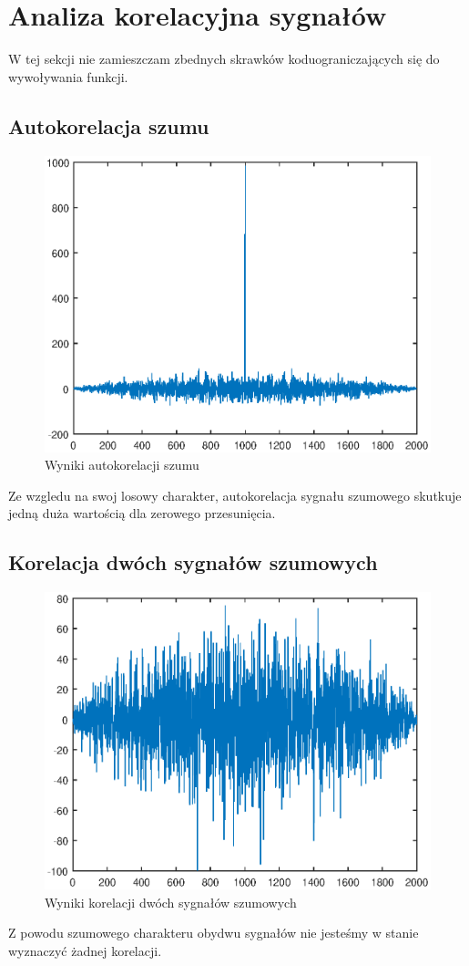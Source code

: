 \documentclass[12pt,titlepage]{report}
\begin{document}
\section{Analiza korelacyjna sygnałów}
W tej sekcji nie zamieszczam zbednych skrawków koduograniczających się do wywoływania funkcji.
\subsection{Autokorelacja szumu}
\begin{figure}[!h]
	\centering
	\includegraphics[scale=0.7]{../cw51_output}
	\caption{Wyniki autokorelacji szumu}
\end{figure}
Ze wzgledu na swoj losowy charakter, autokorelacja sygnału szumowego skutkuje jedną duża wartością dla zerowego przesunięcia.

\subsection{Korelacja dwóch sygnałów szumowych}

\begin{figure}[!h]
	\centering
	\includegraphics[scale=0.7]{../cw52_output}
	\caption{Wyniki korelacji dwóch sygnałów szumowych}
\end{figure}
Z powodu szumowego charakteru obydwu sygnałów nie jesteśmy w stanie wyznaczyć żadnej korelacji.
\newpage
\end{document}
